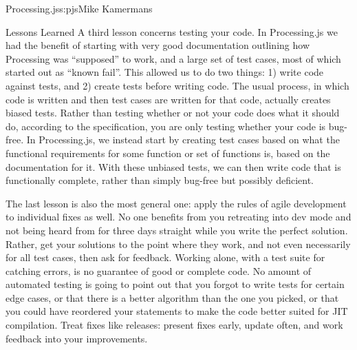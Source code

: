 \begin{aosachapter}{Processing.js}{s:pjs}{Mike Kamermans}
\begin{aosasect1}{Lessons Learned}
A third lesson concerns testing your code. In Processing.js we had the
benefit of starting with very good documentation outlining how
Processing was ``supposed'' to work, and a large set of test cases, most
of which started out as ``known fail''. This allowed us to do two things:
1) write code against tests, and 2) create tests before writing
code. The usual process, in which code is written and then test
cases are written for that code, actually creates biased tests. Rather than
testing whether or not your code does what it should do, according to
the specification, you are only testing whether your code is
bug-free. In Processing.js, we instead start by creating test cases
based on what the functional requirements for some function or set of
functions is, based on the documentation for it. With these unbiased
tests, we can then write code that is functionally complete, rather
than simply bug-free but possibly deficient.

The last lesson is also the most general one: apply the rules of agile
development to individual fixes as well. No one benefits from you
retreating into dev mode and not being heard from for three days
straight while you write the perfect solution. Rather, get your
solutions to the point where they work, and not even necessarily for
all test cases, then ask for feedback. Working alone, with a test
suite for catching errors, is no guarantee of good or complete
code. No amount of automated testing is going to point out that you
forgot to write tests for certain edge cases, or that there is a
better algorithm than the one you picked, or that you could have
reordered your statements to make the code better suited for JIT
compilation. Treat fixes like releases: present fixes early, update
often, and work feedback into your improvements.

\end{aosasect1}

\end{aosachapter}
